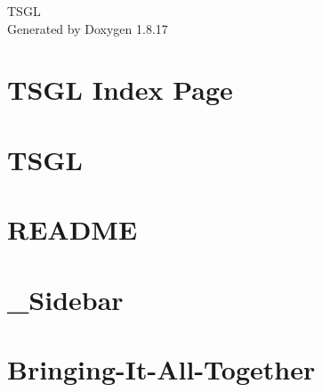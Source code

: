 \let\mypdfximage\pdfximage\def\pdfximage{\immediate\mypdfximage}\documentclass[twoside]{book}
\newcommand{\+}{\discretionary{\mbox{\scriptsize$\hookleftarrow$}}{}{}}
\newcommand{\clearemptydoublepage}{%
  \newpage{\pagestyle{empty}\cleardoublepage}%
}
\begin{document}
\hypersetup{pageanchor=false,
             bookmarksnumbered=true,
             pdfencoding=unicode
            }
\begin{titlepage}
\vspace*{7cm}
\begin{center}%
{\Large T\+S\+GL }\\
\vspace*{1cm}
{\large Generated by Doxygen 1.8.17}\\
\end{center}
\end{titlepage}
\clearemptydoublepage
{}
\tableofcontents
\clearemptydoublepage
{}
\hypersetup{pageanchor=true}

\chapter{T\+S\+GL Index Page}
\label{index}\hypertarget{index}{}
\chapter{T\+S\+GL}
\label{md__home_rvree__t_s_g_l_2_81__t_s_g_l_readme}

\chapter{R\+E\+A\+D\+ME}
\label{md__home_rvree__t_s_g_l_2_81__t_s_g_l_src_stb__r_e_a_d_m_e}

\chapter{\+\_\+\+Sidebar}
\label{md__home_rvree__t_s_g_l_2_81__t_s_g_l__t_s_g_l_8wiki___sidebar}

\chapter{Bringing-\/\+It-\/\+All-\/\+Together}
\label{md__home_rvree__t_s_g_l_2_81__t_s_g_l__t_s_g_l_8wiki__bringing-_it-_all-_together}

\end{document}
